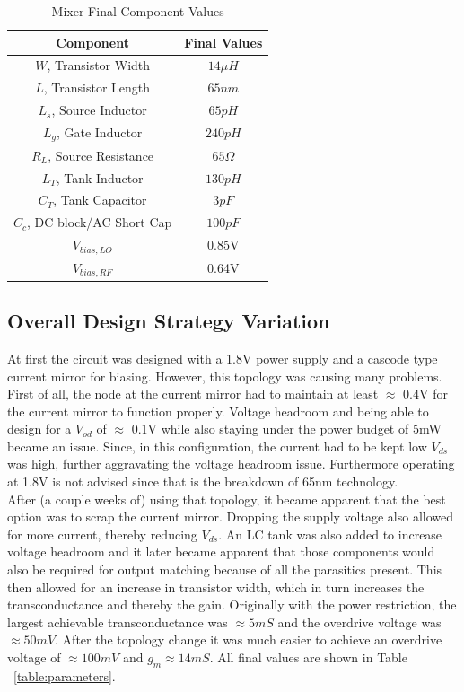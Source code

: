 \documentclass{article}                                                         %
\begin{document}
\begin{table}[H]
\centering
 \begin{tabular}{ | c | c |}
   \hline
    \textbf{Component} & \textbf{Final Values}   \\
    \hline
    \hline
    $W$, Transistor Width & $14 \mu H$ \\
    \hline
    $L$, Transistor Length & $65nm$ \\
    \hline
    $L_s$, Source Inductor & $65pH$ \\
    \hline
    $L_g$, Gate Inductor & $240pH$ \\
    \hline
    $R_L$, Source Resistance & $65\Omega$ \\
    \hline
    $L_T$, Tank Inductor & $130pH$ \\
    \hline
    $C_T$, Tank Capacitor & $3pF$ \\
    \hline
    $C_c$, DC block/AC Short Cap & $100pF$ \\
    \hline
    $V_{bias,LO}$ & 0.85V \\
    \hline
    $V_{bias,RF}$ & 0.64V \\
    \hline
  \end{tabular}
  \caption{Mixer Final Component Values}
  \label{table:finalvals}
\end{table}
\subsection{Overall Design Strategy Variation}

At first the circuit was designed with a 1.8V power supply and a cascode type current mirror for biasing.
However, this topology was causing many problems. First of all, the node at the current mirror
had to maintain at least $\approx$ 0.4V for the current mirror to function properly. Voltage headroom and being able to design for a $V_{od}$
of $\approx$ 0.1V while also staying under the power budget of 5mW became an issue. Since, in this configuration,
the current had to be kept low $V_{ds}$ was high, further aggravating the voltage headroom issue. Furthermore operating at
1.8V is not advised since that is the breakdown of 65nm technology.\\

\vspace{3mm}
After (a couple weeks of) using that topology, it became apparent that the best option was to scrap the current mirror. Dropping the
supply voltage also allowed for more current, thereby reducing $V_{ds}$. An LC
tank was also added to increase voltage headroom and it later became apparent that those components would
also be required for output matching because of all the parasitics present.
This then allowed for an increase in transistor width, which in turn increases the transconductance and thereby the gain.
Originally with the power restriction, the largest achievable transconductance was $\approx 5mS$ and the overdrive voltage
was $\approx 50mV$. After the topology change it was much easier to achieve an overdrive voltage of $\approx 100mV$ and $g_m
\approx 14mS$. All final values are shown in Table ~\ref{table:parameters}.\\
\end{document}
